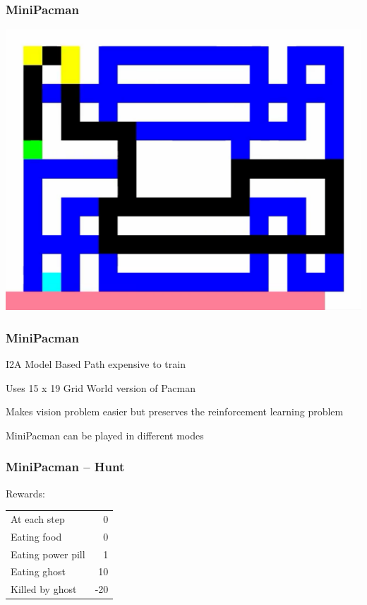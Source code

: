 \PraesentationMasterWeissBlau 
\begin{frame} 
    \frametitle{MiniPacman}
\includegraphics[height=0.5\textheight]{./Images/mini_pacman.png}%
\end{frame} 

\PraesentationMasterStandard

\begin{frame}
    \frametitle{MiniPacman}

\begin{PraesentationAufzaehlung}
	\item I2A Model Based Path expensive to train
	\item Uses 15 x 19 Grid World version of Pacman
	\item Makes vision problem easier but preserves the reinforcement learning problem
	\item MiniPacman can be played in different modes
\end{PraesentationAufzaehlung}
    
\end{frame}
\clearpage

\begin{frame}
    \frametitle{MiniPacman -- Hunt}

Rewards:

	\hspace{-4mm}
	\begin{tabular}{ p{7cm}  r }
 	At each step & 0 \\
  	Eating food & 0 \\
	Eating power pill & 1\\
	Eating ghost & 10\\
	Killed by ghost & -20\\
	\end{tabular}
    
\end{frame}
\clearpage


